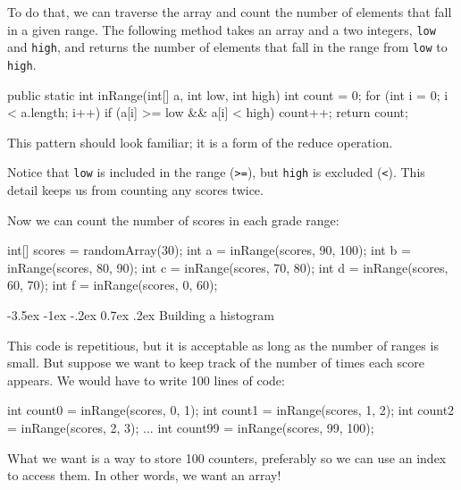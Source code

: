 \documentclass[12pt]{book}
\makeatletter
\theoremstyle{exercise}
\newcommand{\java}[1]{\verb"#1"}
\renewcommand{\section}{\@startsection{section}{1}{\z@}%
    {-3.5ex \@plus -1ex \@minus -.2ex}%
    {0.7ex \@plus.2ex}%
    {\normalfont\Large\bfseries}}
\newcommand{\java}[1]{\lstinline{#1}} %
\makeatother
\begin{document}

To do that, we can traverse the array and count the number of elements that fall in a given range.
The following method takes an array and a two integers, \java{low} and \java{high}, and returns the number of elements that fall in the range from  \java{low} to \java{high}.

\begin{code}
public static int inRange(int[] a, int low, int high) {
    int count = 0;
    for (int i = 0; i < a.length; i++) {
        if (a[i] >= low && a[i] < high) {
            count++;
        }
    }
    return count;
}
\end{code}

This pattern should look familiar; it is a form of the reduce operation.

Notice that \java{low} is included in the range (\java{>=}), but \java{high} is excluded (\java{<}).
This detail keeps us from counting any scores twice.

Now we can count the number of scores in each grade range:

\begin{code}
    int[] scores = randomArray(30);
    int a = inRange(scores, 90, 100);
    int b = inRange(scores, 80, 90);
    int c = inRange(scores, 70, 80);
    int d = inRange(scores, 60, 70);
    int f = inRange(scores, 0, 60);
\end{code}


\section{Building a histogram}

This code is repetitious, but it is acceptable as long as the number of ranges is small.
But suppose we want to keep track of the number of times each score appears.
We would have to write 100 lines of code:

\begin{code}
    int count0 = inRange(scores, 0, 1);
    int count1 = inRange(scores, 1, 2);
    int count2 = inRange(scores, 2, 3);
    ...
    int count99 = inRange(scores, 99, 100);
\end{code}

What we want is a way to store 100 counters, preferably so we can use an index to access them.
In other words, we want an array!
\end{document}
